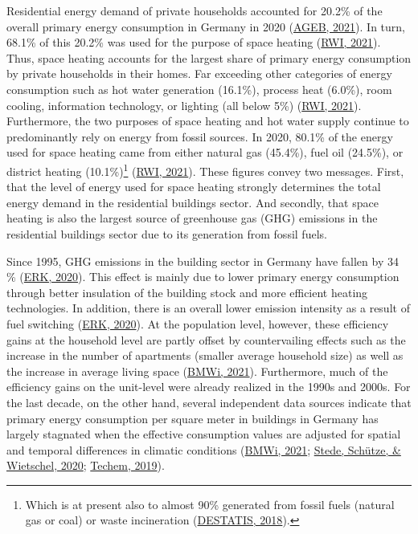 \documentclass[12pt,twoside]{reedthesis}
\begin{document}
Residential energy demand of private households accounted for 20.2\% of the overall primary energy consumption in Germany in 2020 (\protect\hyperlink{ref-ageb21}{AGEB, 2021}). In turn, 68.1\% of this 20.2\% was used for the purpose of space heating (\protect\hyperlink{ref-rwi21}{RWI, 2021}). Thus, space heating accounts for the largest share of primary energy consumption by private households in their homes. Far exceeding other categories of energy consumption such as hot water generation (16.1\%), process heat (6.0\%), room cooling, information technology, or lighting (all below 5\%) (\protect\hyperlink{ref-rwi21}{RWI, 2021}). Furthermore, the two purposes of space heating and hot water supply continue to predominantly rely on energy from fossil sources. In 2020, 80.1\% of the energy used for space heating came from either natural gas (45.4\%), fuel oil (24.5\%), or district heating (10.1\%)\footnote{Which is at present also to almost 90\% generated from fossil fuels (natural gas or coal) or waste incineration (\protect\hyperlink{ref-destatis18}{DESTATIS, 2018}).} (\protect\hyperlink{ref-rwi21}{RWI, 2021}). These figures convey two messages. First, that the level of energy used for space heating strongly determines the total energy demand in the residential buildings sector. And secondly, that space heating is also the largest source of greenhouse gas (GHG) emissions in the residential buildings sector due to its generation from fossil fuels.

Since 1995, GHG emissions in the building sector in Germany have fallen by 34 \% (\protect\hyperlink{ref-erk20}{ERK, 2020}). This effect is mainly due to lower primary energy consumption through better insulation of the building stock and more efficient heating technologies. In addition, there is an overall lower emission intensity as a result of fuel switching (\protect\hyperlink{ref-erk20}{ERK, 2020}). At the population level, however, these efficiency gains at the household level are partly offset by countervailing effects such as the increase in the number of apartments (smaller average household size) as well as the increase in average living space (\protect\hyperlink{ref-bmwi21}{BMWi, 2021}). Furthermore, much of the efficiency gains on the unit-level were already realized in the 1990s and 2000s. For the last decade, on the other hand, several independent data sources indicate that primary energy consumption per square meter in buildings in Germany has largely stagnated when the effective consumption values are adjusted for spatial and temporal differences in climatic conditions (\protect\hyperlink{ref-bmwi21}{BMWi, 2021}; \protect\hyperlink{ref-stede_etal20}{Stede, Schütze, \& Wietschel, 2020}; \protect\hyperlink{ref-techem19}{Techem, 2019}).
\end{document}
